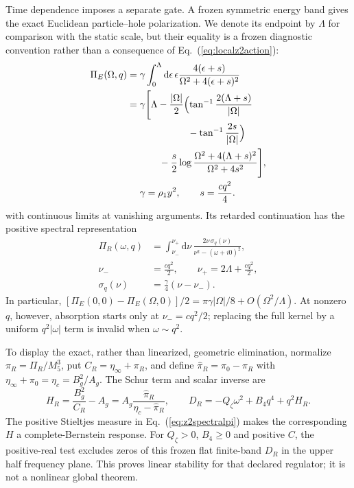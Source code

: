 \documentclass[10pt]{article}
\newcommand{\dd}{\mathrm{d}}
\begin{document}
Time dependence imposes a separate gate.  A frozen symmetric energy band gives
the exact Euclidean particle--hole polarization.  We denote its endpoint by
$\Lambda$ for comparison with the static scale, but their equality is a frozen
diagnostic convention rather than a consequence of
Eq.~(\ref{eq:localz2action}):
\begin{equation}
 \begin{aligned}
 \Pi_E(\Omega,q)={}&\gamma\int_0^\Lambda\dd\epsilon\,
 \epsilon\frac{4(\epsilon+s)}{\Omega^2+4(\epsilon+s)^2}\\
 ={}&\gamma\Biggl[\Lambda-\frac{|\Omega|}{2}
 \Bigl(\tan^{-1}\frac{2(\Lambda+s)}{|\Omega|}\\
 &\hspace{5em}-\tan^{-1}\frac{2s}{|\Omega|}\Bigr)\\
 &\hspace{2em}-\frac{s}{2}\log
 \frac{\Omega^2+4(\Lambda+s)^2}{\Omega^2+4s^2}\Biggr],\\
 &\gamma=\rho_1y^2,\qquad s=\frac{cq^2}{4}.
 \end{aligned}
 \label{eq:z2finitebandpi}
\end{equation}
with continuous limits at vanishing arguments.  Its retarded continuation has
the positive spectral representation
\begin{equation}
 \begin{aligned}
 \Pi_R(\omega,q)&=\int_{\nu_-}^{\nu_+}\dd\nu\,
 \frac{2\nu\,\sigma_q(\nu)}{\nu^2-(\omega+i0)^2},\\
 \nu_-&=\frac{cq^2}{2},\qquad
 \nu_+=2\Lambda+\frac{cq^2}{2},\\
 \sigma_q(\nu)&=\frac{\gamma}{4}(\nu-\nu_-).
 \end{aligned}
 \label{eq:z2spectralpi}
\end{equation}
In particular,
$[\Pi_E(0,0)-\Pi_E(\Omega,0)]/2
=\pi\gamma|\Omega|/8+O(\Omega^2/\Lambda)$.  At nonzero $q$, however, absorption
starts only at $\nu_-=cq^2/2$; replacing the full kernel by a uniform
$q^2|\omega|$ term is invalid when $\omega\sim q^2$.

To display the exact, rather than linearized, geometric elimination, normalize
$\pi_R=\Pi_R/M_5^3$, put
$C_R=\eta_\infty+\pi_R$, and define
$\widehat\pi_R=\pi_0-\pi_R$ with
$\eta_\infty+\pi_0=\eta_c=B_g^2/A_g$.  The Schur term and scalar inverse are
\begin{equation}
 H_R=\frac{B_g^2}{C_R}-A_g
    =A_g\frac{\widehat\pi_R}{\eta_c-\widehat\pi_R},\qquad
 D_R=-Q_\zeta\omega^2+B_4q^4+q^2H_R .
 \label{eq:z2exactretardedschur}
\end{equation}
The positive Stieltjes measure in Eq.~(\ref{eq:z2spectralpi}) makes the
corresponding $H$ a complete-Bernstein response.  For $Q_\zeta>0$, $B_4\geq0$
and positive $C$, the positive-real test excludes zeros of this frozen flat
finite-band $D_R$ in the upper half frequency plane.  This proves linear
stability for that declared regulator; it is not a nonlinear global theorem.
\end{document}

